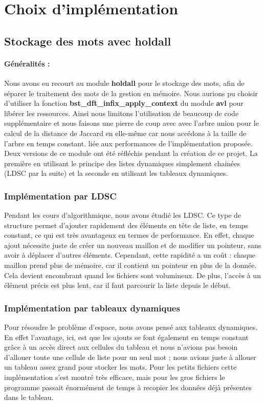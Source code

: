 \documentclass{article}
\begin{document}
\section{Choix d'implémentation}

\subsection{Stockage des mots avec holdall}
\paragraph{Généralités :}
Nous avons eu recourt au module \textbf{holdall} pour le stockage des mots, 
afin de séparer le traitement des mots de la gestion en mémoire. Nous aurions pu choisir d'utiliser la fonction
\textbf{bst\_dft\_infix\_apply\_context} du module \textbf{avl} pour libérer les ressources.
Ainsi nous limitons l'utilisation de beaucoup de code supplémentaire et nous faisons une pierre de coup avec 
avec l'arbre union pour le calcul de la distance de Jaccard en elle-même car nous accédons à la taille de l'arbre en temps constant.
liée aux performances de l'implémentation proposée. Deux versions de ce module ont été réfléchis pendant la création de ce projet. 
La première en utilisant le principe des listes dynamiques simplement chainées (LDSC par la suite) et la seconde en utilisant les tableaux dynamiques.
\subsubsection{Implémentation par LDSC}\label{subsec:impl}
Pendant les cours d'algorithmique, nous avons étudié les LDSC.
Ce type de structure permet d'ajouter rapidement des éléments en tête de liste, en temps constant,
ce qui est très avantageux en termes de performance. En effet, chaque ajout nécessite juste de créer
un nouveau maillon et de modifier un pointeur, sans avoir à déplacer d'autres éléments. 
Cependant, cette rapidité a un coût : chaque maillon prend plus de mémoire, car il contient un pointeur en 
plus de la donnée. Cela devient encombrant quand les fichiers sont volumineux. De plus, l'accès à un élément précis 
est plus lent, car il faut parcourir la liste depuis le début.
\subsubsection{Implémentation par tableaux dynamiques}
Pour résoudre le problème d'espace, nous avons pensé aux tableaux dynamiques. En effet l'avantage, ici,
est que les ajouts se font également en temps constant grâce à un accès direct aux cellules du tableau et nous n'avions
pas besoin d'allouer toute une cellule de liste pour un seul mot ; nous avions juste à allouer un tableau assez grand pour
stocker les mots. Pour les petits fichiers cette implémentation s'est montré très efficace, mais pour les gros fichiers
le programme passait énormément de temps à recopier les données déjà présentes dans le tableau.
\end{document}
